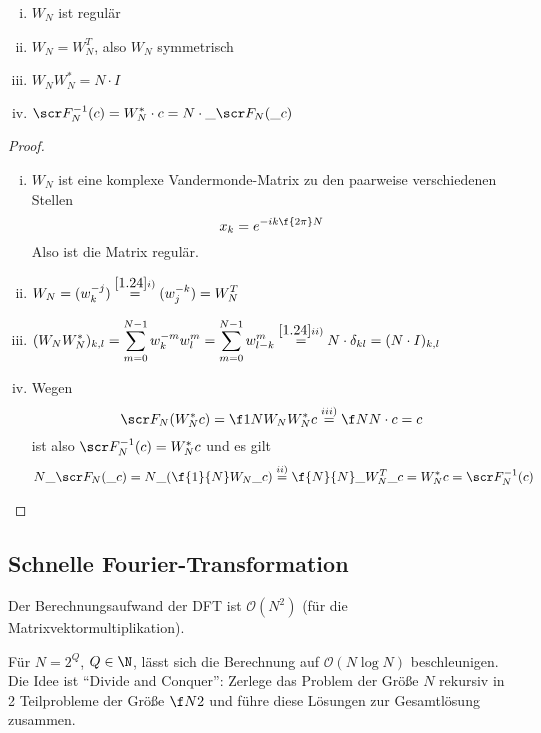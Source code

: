 \documentclass[11pt]{scrbook}
\begin{document}
\begin{lem}[Eigenschaften] \label{1.27}
	\begin{enumerate}[i)]
		\item
			$\displaystyle W_N$ ist regulär
		\item
			$\displaystyle W_N = W_N^T$, also $W_N$ symmetrisch
		\item
			$\displaystyle W_NW_N^{*} = N\cdot I$
		\item
			$\displaystyle \scr F_N^{-1}(c) = W^*_N\cdot c = N \cdot \_{\scr F_N(\_c)}$
	\end{enumerate}
	\begin{proof}
		\begin{enumerate}[i)]
			\item
				$W_N$ ist eine komplexe Vandermonde-Matrix zu den paarweise verschiedenen Stellen
				\[
					x_k = e^{-ik\f {2\pi}N}
				\]
				Also ist die Matrix regulär.
			\item
				$\displaystyle W_N = (w_k^{-j}) \stackrel{\ref{1.24} i)}=  (w_j^{-k}) = W_N^T$
			\item
				$\displaystyle (W_NW_N^*)_{k,l} = \sum_{m=0}^{N-1} w_k^{-m}w_l^m = \sum_{m=0}^{N-1} w_{l-k}^m \stackrel{\ref{1.24} ii)}= N\cdot \delta_{kl} = (N\cdot I)_{k,l}$
			\item
				Wegen
				\[
					\scr F_N (W_N^* c) = \f 1N W_N W_N^* c \stackrel{iii)}= \f N N \cdot c = c
				\]
				ist also $\scr F_N^{-1} (c) = W_N^* c$ und es gilt
				\[
					N \_{\scr F_N(\_c)}
					= N \_{\left(\f {1}{N} W_N \_c\right)} 
					\stackrel{ii)}= \f{N}{N} \_{W_N^T \_c} 
					= W_N^* c 
					= \scr F_N^{-1}(c)
				\]
		\end{enumerate}
	\end{proof}
\end{lem}


\subsection{Schnelle Fourier-Transformation}

Der Berechnungsaufwand der DFT ist $\mathcal O(N^2)$ (für die Matrixvektormultiplikation).

Für $N=2^Q$, $Q\in \N$, lässt sich die Berechnung auf $\mathcal O(N\log N)$ beschleunigen.
Die Idee ist “Divide and Conquer”: Zerlege das Problem der Größe $N$ rekursiv in 2 Teilprobleme der Größe $\f N2$ und führe diese Lösungen zur Gesamtlösung zusammen.
\end{document}
